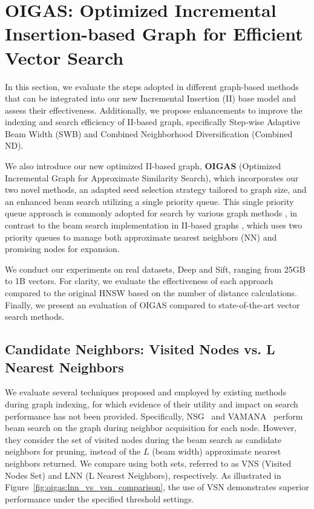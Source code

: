 \section{OIGAS: Optimized Incremental
Insertion-based Graph for Efficient
Vector Search}
In this section, we evaluate the steps adopted in different graph-based methods that can be integrated into our new Incremental Insertion (II) base model and assess their effectiveness. Additionally, we propose enhancements to improve the indexing and search efficiency of II-based graph, specifically Step-wise Adaptive Beam Width (SWB) and Combined Neighborhood Diversification (Combined ND).

We also introduce our new optimized II-based graph, \textbf{OIGAS} (Optimized Incremental Graph for Approximate Similarity Search), which incorporates our two novel methods, an adapted seed selection strategy tailored to graph size, and an enhanced beam search utilizing a single priority queue. This single priority queue approach is commonly adopted for search by various graph methods \cite{vamana,nsg,nssg,efanna,dpg}, in contrast to the beam search implementation in II-based graphs \cite{hnsw,nsw11,elpis}, which uses two priority queues to manage both approximate nearest neighbors (NN) and promising nodes for expansion.

We conduct our experiments on real datasets, Deep and Sift, ranging from 25GB to 1B vectors. For clarity, we evaluate the effectiveness of each approach compared to the original HNSW based on the number of distance calculations. Finally, we present an evaluation of OIGAS compared to state-of-the-art vector search methods.



\subsection{Candidate Neighbors: Visited Nodes vs. L Nearest Neighbors}
We evaluate several techniques proposed and employed by existing methods during graph indexing, for which evidence of their utility and impact on search performance has not been provided. Specifically, NSG~\cite{nsg} and VAMANA~\cite{vamana} perform beam search on the graph during neighbor acquisition for each node. However, they consider the set of visited nodes during the beam search as candidate neighbors for pruning, instead of the $L$ (beam width) approximate nearest neighbors returned. We compare using both sets, referred to as VNS (Visited Nodes Set) and LNN (L Nearest Neighbors), respectively.
As illustrated in Figure~\ref{fig:oigas:lnn_vs_vsn_comparison}, the use of VSN demonstrates superior performance under the specified threshold settings.


